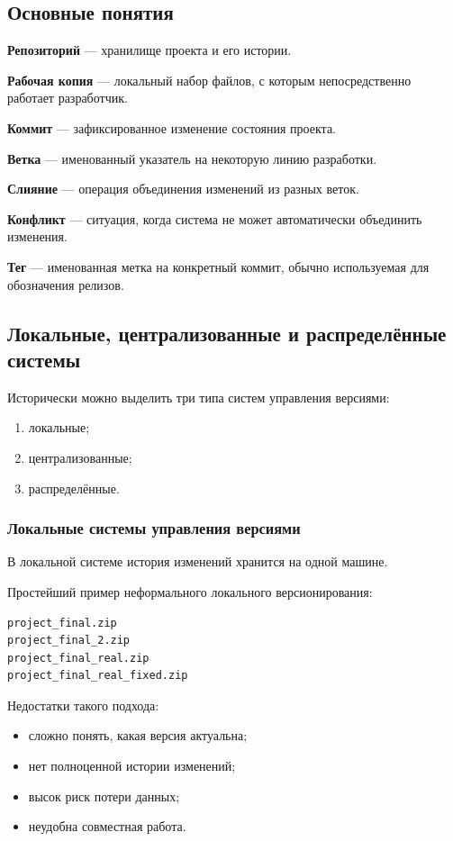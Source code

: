 \documentclass[12pt,a4paper]{article}
\begin{document}
\subsection{Основные понятия}

\textbf{Репозиторий} --- хранилище проекта и его истории.

\textbf{Рабочая копия} --- локальный набор файлов, с которым непосредственно работает разработчик.

\textbf{Коммит} --- зафиксированное изменение состояния проекта.

\textbf{Ветка} --- именованный указатель на некоторую линию разработки.

\textbf{Слияние} --- операция объединения изменений из разных веток.

\textbf{Конфликт} --- ситуация, когда система не может автоматически объединить изменения.

\textbf{Тег} --- именованная метка на конкретный коммит, обычно используемая для обозначения релизов.

\subsection{Локальные, централизованные и распределённые системы}

Исторически можно выделить три типа систем управления версиями:

\begin{enumerate}
    \item локальные;
    \item централизованные;
    \item распределённые.
\end{enumerate}

\subsubsection{Локальные системы управления версиями}

В локальной системе история изменений хранится на одной машине.

Простейший пример неформального локального версионирования:

\begin{lstlisting}
project_final.zip
project_final_2.zip
project_final_real.zip
project_final_real_fixed.zip
\end{lstlisting}

Недостатки такого подхода:

\begin{itemize}
    \item сложно понять, какая версия актуальна;
    \item нет полноценной истории изменений;
    \item высок риск потери данных;
    \item неудобна совместная работа.
\end{itemize}
\end{document}

